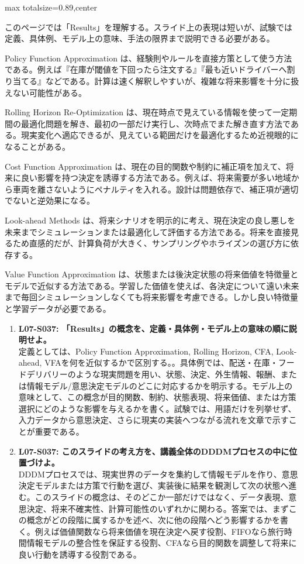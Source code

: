 \begin{minipage}[t]{0.58\textwidth}
\begin{adjustbox}{max totalsize={\textwidth}{0.89\textheight},center}
\begin{minipage}{\textwidth}\scriptsize
{}このページでは「Results」を理解する。スライド上の表現は短いが、試験では定義、具体例、モデル上の意味、手法の限界まで説明できる必要がある。\par
Policy Function Approximation は、経験則やルールを直接方策として使う方法である。例えば『在庫が閾値を下回ったら注文する』『最も近いドライバーへ割り当てる』などである。計算は速く解釈しやすいが、複雑な将来影響を十分に扱えない可能性がある。\par
Rolling Horizon Re-Optimization は、現在時点で見えている情報を使って一定期間の最適化問題を解き、最初の一部だけ実行し、次時点でまた解き直す方法である。現実変化へ適応できるが、見えている範囲だけを最適化するため近視眼的になることがある。\par
Cost Function Approximation は、現在の目的関数や制約に補正項を加えて、将来に良い影響を持つ決定を誘導する方法である。例えば、将来需要が多い地域から車両を離さないようにペナルティを入れる。設計は問題依存で、補正項が適切でないと逆効果になる。\par
Look-ahead Methods は、将来シナリオを明示的に考え、現在決定の良し悪しを未来までシミュレーションまたは最適化して評価する方法である。将来を直接見るため直感的だが、計算負荷が大きく、サンプリングやホライズンの選び方に依存する。\par
Value Function Approximation は、状態または後決定状態の将来価値を特徴量とモデルで近似する方法である。学習した価値を使えば、各決定について遠い未来まで毎回シミュレーションしなくても将来影響を考慮できる。しかし良い特徴量と学習データが必要である。\par{}\begin{enumerate}\item \textbf{L07-S037: 「Results」の概念を、定義・具体例・モデル上の意味の順に説明せよ。}\\定義としては、Policy Function Approximation, Rolling Horizon, CFA, Look-ahead, VFAを何を近似するかで区別する。。具体例では、配送・在庫・フードデリバリーのような現実問題を用い、状態、決定、外生情報、報酬、または情報モデル/意思決定モデルのどこに対応するかを明示する。モデル上の意味として、この概念が目的関数、制約、状態表現、将来価値、または方策選択にどのような影響を与えるかを書く。試験では、用語だけを列挙せず、入力データから意思決定、さらに現実の実装へつながる流れを文章で示すことが重要である。\item \textbf{L07-S037: このスライドの考え方を、講義全体のDDDMプロセスの中に位置づけよ。}\\DDDMプロセスでは、現実世界のデータを集約して情報モデルを作り、意思決定モデルまたは方策で行動を選び、実装後に結果を観測して次の状態へ進む。このスライドの概念は、そのどこか一部だけではなく、データ表現、意思決定、将来不確実性、計算可能性のいずれかに関わる。答案では、まずこの概念がどの段階に属するかを述べ、次に他の段階へどう影響するかを書く。例えば価値関数なら将来価値を現在決定へ戻す役割、FIFOなら旅行時間情報モデルの整合性を保証する役割、CFAなら目的関数を調整して将来に良い行動を誘導する役割である。\end{enumerate}

\end{minipage}
\end{adjustbox}
\end{minipage}

